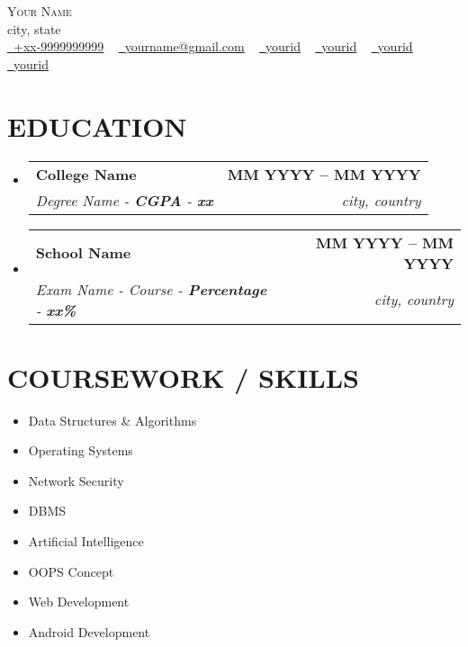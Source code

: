 \documentclass[letterpaper,11pt]{article}
\makeatletter
\newcommand{\resumeSubheading}[4]{
    \vspace{-2pt}\item
    \begin{tabular*}{1.0\textwidth}[t]{l@{\extracolsep{\fill}}r}
        \textbf{\large#1} & \textbf{\small #2} \\
        \textit{\large#3} & \textit{\small #4} \\
    \end{tabular*}\vspace{-7pt}
}
\newcommand{\resumeSubHeadingListStart}{\begin{itemize}[leftmargin=0.0in, label={}]}
\newcommand{\resumeSubHeadingListEnd}{\end{itemize}}
\makeatother
\begin{document}
\begin{center}
{\Huge \scshape Your Name} \\ \vspace{1pt}
city, state \\ \vspace{1pt}
\small
\href{tel:+xxxxxxxxxxxx}{\raisebox{-0.1\height} \ \underline{+xx-9999999999}} ~
\href{mailto:yourname@gmail.com}{\raisebox{-0.2\height} \ \underline{yourname@gmail.com}} ~
\href{https://linkedin.com/in/yourid}{\raisebox{-0.2\height} \ \underline{yourid}} ~
\href{https://github.com/yourid}{\raisebox{-0.2\height} \ \underline{yourid}} ~
\href{https://www.hackerrank.com/yourid}{\raisebox{-0.2\height} \ \underline{yourid}} ~
\href{https://codeforces.com/profile/yourid}{\raisebox{-0.2\height} \ \underline{yourid}}
\vspace{-8pt}
\end{center}

\section{EDUCATION}
\resumeSubHeadingListStart
\resumeSubheading{College Name}{MM YYYY -- MM YYYY}
{Degree Name - \textbf{CGPA} - \textbf{xx}}{city, country}
\resumeSubheading{School Name}{MM YYYY -- MM YYYY}
{Exam Name - Course - \textbf{Percentage} - \textbf{xx\%}}{city, country}
\resumeSubHeadingListEnd

\section{COURSEWORK / SKILLS}
\begin{multicols}{4}
\begin{itemize}[itemsep=-2pt]
\item Data Structures \& Algorithms
\item Operating Systems
\item Network Security
\item DBMS
\item Artificial Intelligence
\item OOPS Concept
\item Web Development
\item Android Development
\end{itemize}
\end{multicols}
\vspace*{2.0\multicolsep}
\end{document}

